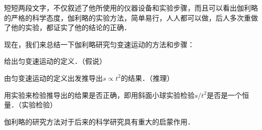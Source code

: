 \begin{History}[伽利略对匀变速运动的研究]
短短两段文字，不仅叙述了他所使用的仪器设备和实验步骤，而且可以看出伽利略的严格的科学态度，伽利略的实验方法，简单易行，人人都可以做，后人多次重做了他的实验，都证实了他的结论的正确．

现在，我们来总结一下伽利略研究匀变速运动的方法和步骤：
\begin{QsNum}
    \item 给出匀变速运动的定义．（假说）
    \item 由匀变速运动的定义出发推导出$s\propto t^2$的结果．（推理）
    \item 用实验来检验推导出的给果是否正确，即用斜面小球实验检验$s/t^2$是否是一个恒量．（实验检验）
\end{QsNum}

伽利略的研究方法对于后来的科学研究具有重大的启蒙作用．

\end{History}


